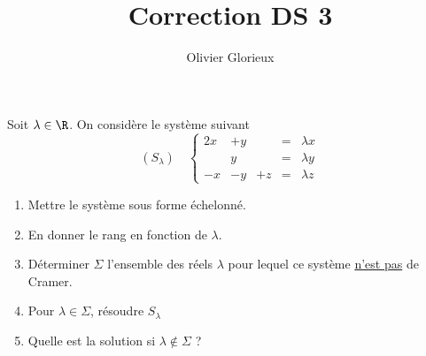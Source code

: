 \documentclass[a4paper, 11pt,reqno]{article}
\author{Olivier Glorieux}
\begin{document}
\title{Correction DS 3}



%





\begin{exercice}
Soit $\lambda \in \R$. On considère le système suivant 
$$(S_\lambda)\quad  \left\{ \begin{array}{ccccc}
2x &+y& & =& \lambda x\\
 &y & & =& \lambda y \\
 -x&-y&+z&=&\lambda z
\end{array}\right. $$

\begin{enumerate}
\item Mettre le système sous forme échelonné. 
\item En donner le rang en fonction de $\lambda$. 
\item Déterminer $\Sigma$ l'ensemble des réels $\lambda$ pour lequel ce système \underline{n'est pas} de Cramer. 
\item Pour $\lambda \in \Sigma$, résoudre $S_\lambda$
\item Quelle est la solution si $\lambda \notin \Sigma$ ? 
\end{enumerate}
\end{exercice}
\end{document}
